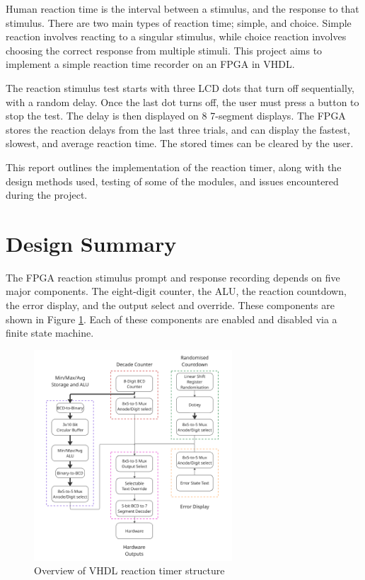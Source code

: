 \documentclass[11pt]{article}
\begin{document}
Human reaction time is the interval between a stimulus, and the response to that stimulus. There are two main types of reaction time; simple, and choice. Simple reaction involves reacting to a singular stimulus, while choice reaction involves choosing the correct response from multiple stimuli. This project aims to implement a simple reaction time recorder on an FPGA in VHDL.

The reaction stimulus test starts with three LCD dots that turn off sequentially, with a random delay. Once the last dot turns off, the user must press a button to stop the test. The delay is then displayed on 8 7-segment displays. The FPGA stores the reaction delays from the last three trials, and can display the fastest, slowest, and average reaction time. The stored times can be cleared by the user.

This report outlines the implementation of the reaction timer, along with the design methods used, testing of some of the modules, and issues encountered during the project.

\section{Design Summary}

The FPGA reaction stimulus prompt and response recording depends on five major components. The eight-digit counter, the ALU, the reaction countdown, the error display, and the output select and override. These components are shown in Figure \ref{project_structure}. Each of these components are enabled and disabled via a finite state machine.

\begin{figure}[H]
  \centering
  \includegraphics[width=0.66\textwidth]{project_overall_structure.png}
  \caption{Overview of VHDL reaction timer structure}
  \label{project_structure}
\end{figure}
\end{document}
